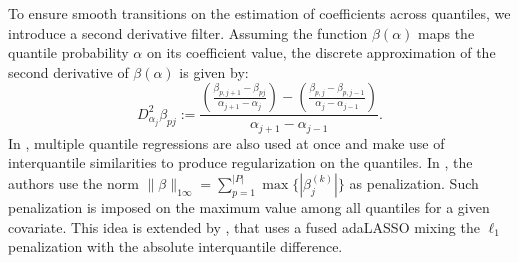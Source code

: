 To ensure smooth transitions on the estimation of coefficients across quantiles, we introduce a second derivative filter. Assuming the function $\beta(\alpha)$ maps the quantile probability $\alpha$ on its coefficient value, the discrete approximation of the second derivative of $\beta(\alpha)$ is given by:
\begin{equation}
D_{\alpha_j}^{2} \beta_{pj} := \frac{\left(\frac{\beta_{p,j+1}-\beta_{pj}}{\alpha_{j+1}-\alpha_{j}}\right)-\left(\frac{\beta_{p,j}-\beta_{p,j-1}}{\alpha_{j}-\alpha_{j-1}}\right)}{\alpha_{j+1}-\alpha_{j-1}}. 
\end{equation}
In \cite{zou_regularized_2008, jiang_interquantile_2014}, multiple quantile regressions are also used at once and make use of interquantile similarities to produce regularization on the quantiles. In \cite{zou_regularized_2008}, the authors use the norm $\| \beta \|_{1\infty}=\sum_{p=1}^{|P|} \max\{ |\beta_j^{(k)} |\}$ as penalization. Such penalization is imposed on the maximum value among all quantiles for a given covariate. This idea is extended by \cite{jiang_interquantile_2014}, that uses a fused adaLASSO mixing the $\ell_1$ penalization with the absolute interquantile difference.

